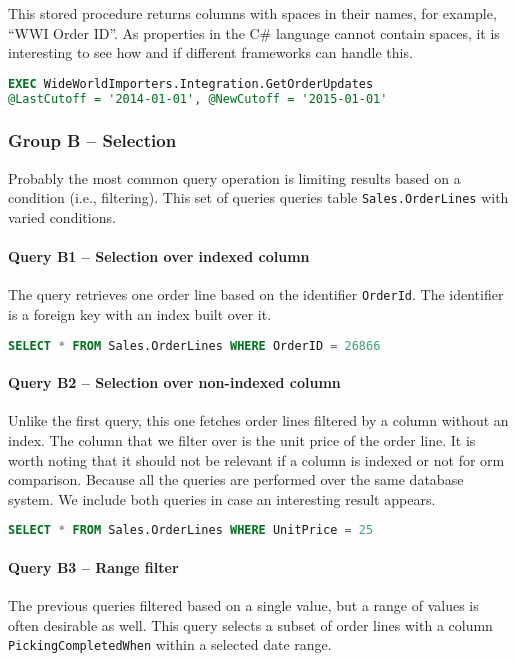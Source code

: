 This stored procedure returns columns with spaces in their names, for example, ``WWI Order ID''. As properties in the C\# language cannot contain spaces, it is interesting to see how and if different frameworks can handle this.

\begin{lstlisting}[language=SQL]
EXEC WideWorldImporters.Integration.GetOrderUpdates 
@LastCutoff = '2014-01-01', @NewCutoff = '2015-01-01'
\end{lstlisting}

\subsubsection{Group B -- Selection}
Probably the most common query operation is limiting results based on a condition (i.e., filtering). This set of queries queries table \texttt{Sales.OrderLines} with varied conditions.

\paragraph{Query B1 -- Selection over indexed column}
\label{query:b1}
The query retrieves one order line based on the identifier \texttt{OrderId}. The identifier is a foreign key with an index built over it.

\begin{lstlisting}[language=SQL]
SELECT * FROM Sales.OrderLines WHERE OrderID = 26866
\end{lstlisting}

\paragraph{Query B2 -- Selection over non-indexed column}
\label{query:b2}
Unlike the first query, this one fetches order lines filtered by a column without an index. The column that we filter over is the unit price of the order line.
It is worth noting that it should not be relevant if a column is indexed or not for \acrshort{orm} comparison. Because all the queries are performed over the same database system. We include both queries in case an interesting result appears.

\begin{lstlisting}[language=SQL]
SELECT * FROM Sales.OrderLines WHERE UnitPrice = 25
\end{lstlisting}

\paragraph{Query B3 -- Range filter}
\label{query:b3}
The previous queries filtered based on a single value, but a range of values is often desirable as well.
This query selects a subset of order lines with a column \texttt{PickingCompletedWhen} within a selected date range.

